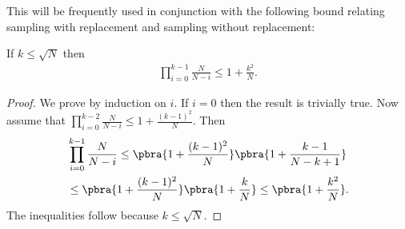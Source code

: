 This  will be frequently used in conjunction with the following bound relating sampling with replacement and sampling without replacement:
\begin{fact}\label{fact:k^2}
    If $k\leq \sqrt{N}$ then 
    \begin{align*}
        \prod_{i=0}^{k-1}\frac{N}{N-i}\leq 1+\frac{k^2}{N}.
    \end{align*}
\end{fact}
\begin{proof}
    We prove by induction on $i$. If $i=0$ then the result is trivially true. Now assume that $\prod_{i=0}^{k-2}\frac{N}{N-i}\leq 1+\frac{(k-1)^2}{N}$. Then
    \begin{align*}
        &\prod_{i=0}^{k-1}\frac{N}{N-i}
        \leq \pbra{1+\frac{(k-1)^2}{N}}\pbra{1+\frac{k-1}{N-k+1}}\\
        &\leq \pbra{1+\frac{(k-1)^2}{N}}\pbra{1+\frac{k}N}
        \leq \pbra{1+\frac{k^2}{N}}.
    \end{align*}
    The inequalities follow because $k\leq \sqrt{N}$.
\end{proof}


